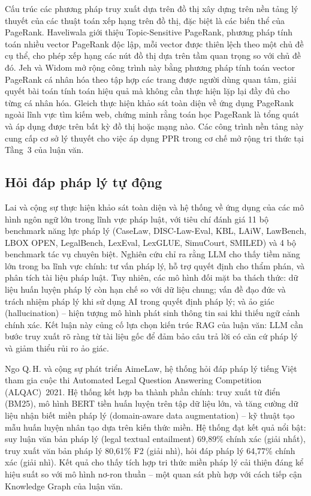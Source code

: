 Cấu trúc các phương pháp truy xuất dựa trên đồ thị xây dựng trên nền tảng lý
thuyết của các thuật toán xếp hạng trên đồ thị, đặc biệt là các biến thể của
PageRank. Haveliwala \cite{haveliwala2002ppr} giới thiệu Topic-Sensitive PageRank,
phương pháp tính toán nhiều vector PageRank độc lập, mỗi vector được thiên lệch
theo một chủ đề cụ thể, cho phép xếp hạng các nút đồ thị dựa trên tầm quan trọng
so với chủ đề đó. Jeh và Widom \cite{jeh2003ppr} mở rộng công trình này bằng
phương pháp tính toán vector PageRank cá nhân hóa theo tập hợp các trang được người
dùng quan tâm, giải quyết bài toán tính toán hiệu quả mà không cần thực hiện lặp
lại đầy đủ cho từng cá nhân hóa. Gleich \cite{gleich2015pagerank} thực hiện khảo
sát toàn diện về ứng dụng PageRank ngoài lĩnh vực tìm kiếm web, chứng minh rằng
toán học PageRank là tổng quát và áp dụng được trên bất kỳ đồ thị hoặc mạng nào.
Các công trình nền tảng này cung cấp cơ sở lý thuyết cho việc áp dụng PPR trong
cơ chế mở rộng tri thức tại Tầng~3 của luận văn.

\subsection{Hỏi đáp pháp lý tự động}
\label{subsec:hoi-dap-phap-ly}

Lai và cộng sự \cite{lai2024llmlaw} thực hiện khảo sát toàn diện và hệ thống về ứng
dụng của các mô hình ngôn ngữ lớn trong lĩnh vực pháp luật, với tiêu chí đánh giá
11 bộ benchmark năng lực pháp lý (CaseLaw, DISC-Law-Eval, KBL, LAiW, LawBench, LBOX
OPEN, LegalBench, LexEval, LexGLUE, SimuCourt, SMILED) và 4 bộ benchmark tác vụ
chuyên biệt. Nghiên cứu chỉ ra rằng LLM cho thấy tiềm năng lớn trong ba lĩnh vực
chính: tư vấn pháp lý, hỗ trợ quyết định cho thẩm phán, và phân tích tài liệu pháp
luật. Tuy nhiên, các mô hình đối mặt ba thách thức: dữ liệu huấn luyện pháp lý
còn hạn chế so với dữ liệu chung; vấn đề đạo đức và trách nhiệm pháp lý khi sử
dụng AI trong quyết định pháp lý; và ảo giác (hallucination) -- hiện tượng mô
hình phát sinh thông tin sai khi thiếu ngữ cảnh chính xác. Kết luận này củng cố lựa
chọn kiến trúc RAG của luận văn: LLM cần bước truy xuất rõ ràng từ tài liệu gốc để
đảm bảo câu trả lời có căn cứ pháp lý và giảm thiểu rủi ro ảo giác.

Ngo Q.\,H. và cộng sự \cite{ngo2021aimelaw} phát triển AimeLaw, hệ thống hỏi đáp pháp lý
tiếng Việt tham gia cuộc thi Automated Legal Question Answering Competition
(ALQAC)~2021. Hệ thống kết hợp ba thành phần chính: truy xuất từ điển (BM25), mô
hình BERT tiền huấn luyện trên tập dữ liệu lớn, và tăng cường dữ liệu nhận biết
miền pháp lý (domain-aware data augmentation) -- kỹ thuật tạo mẫu huấn luyện nhân
tạo dựa trên kiến thức miền. Hệ thống đạt kết quả nổi bật: suy luận văn bản pháp
lý (legal textual entailment) 69,89\% chính xác (giải nhất), truy xuất văn bản pháp
lý 80,61\% F2 (giải nhì), hỏi đáp pháp lý 64,77\% chính xác (giải nhì). Kết quả
cho thấy tích hợp tri thức miền pháp lý cải thiện đáng kể hiệu suất so với mô hình
nơ-ron thuần -- một quan sát phù hợp với cách tiếp cận Knowledge Graph của luận văn.

